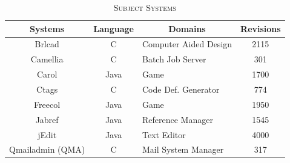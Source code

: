\documentclass[review]{elsarticle}
\begin{document}
\begin{table}[htbp] 
\caption{\label{tab:subject-systems-cc}\textsc{Subject Systems}}
\centering
\begin{tabular}{|c|c|l|c|}
\hline
\textbf{Systems} & \textbf{Language} & \multicolumn{1}{c|}{\textbf{Domains}} & \textbf{Revisions} \\ \hline \hline
Brlcad           & C              & Computer Aided Design                 & 2115               \\ \hline
Camellia         & C              & Batch Job Server                      & 301                \\ \hline
Carol            & Java           & Game                                  & 1700               \\ \hline
Ctags            & C              & Code Def. Generator                   & 774                \\ \hline
Freecol          & Java           & Game                                  & 1950               \\ \hline
Jabref           & Java           & Reference Manager                     & 1545               \\ \hline
jEdit            & Java           & Text Editor                           & 4000               \\ \hline
Qmailadmin (QMA)       & C              & Mail System Manager                   & 317                \\ \hline
\end{tabular}
\end{table}
\end{document}

